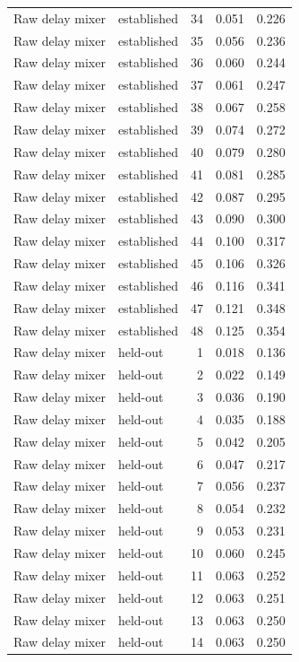 \begin{tabular}{llrrr}
Raw delay mixer & established & 34 & 0.051 & 0.226 \\
Raw delay mixer & established & 35 & 0.056 & 0.236 \\
Raw delay mixer & established & 36 & 0.060 & 0.244 \\
Raw delay mixer & established & 37 & 0.061 & 0.247 \\
Raw delay mixer & established & 38 & 0.067 & 0.258 \\
Raw delay mixer & established & 39 & 0.074 & 0.272 \\
Raw delay mixer & established & 40 & 0.079 & 0.280 \\
Raw delay mixer & established & 41 & 0.081 & 0.285 \\
Raw delay mixer & established & 42 & 0.087 & 0.295 \\
Raw delay mixer & established & 43 & 0.090 & 0.300 \\
Raw delay mixer & established & 44 & 0.100 & 0.317 \\
Raw delay mixer & established & 45 & 0.106 & 0.326 \\
Raw delay mixer & established & 46 & 0.116 & 0.341 \\
Raw delay mixer & established & 47 & 0.121 & 0.348 \\
Raw delay mixer & established & 48 & 0.125 & 0.354 \\
Raw delay mixer & held-out & 1 & 0.018 & 0.136 \\
Raw delay mixer & held-out & 2 & 0.022 & 0.149 \\
Raw delay mixer & held-out & 3 & 0.036 & 0.190 \\
Raw delay mixer & held-out & 4 & 0.035 & 0.188 \\
Raw delay mixer & held-out & 5 & 0.042 & 0.205 \\
Raw delay mixer & held-out & 6 & 0.047 & 0.217 \\
Raw delay mixer & held-out & 7 & 0.056 & 0.237 \\
Raw delay mixer & held-out & 8 & 0.054 & 0.232 \\
Raw delay mixer & held-out & 9 & 0.053 & 0.231 \\
Raw delay mixer & held-out & 10 & 0.060 & 0.245 \\
Raw delay mixer & held-out & 11 & 0.063 & 0.252 \\
Raw delay mixer & held-out & 12 & 0.063 & 0.251 \\
Raw delay mixer & held-out & 13 & 0.063 & 0.250 \\
Raw delay mixer & held-out & 14 & 0.063 & 0.250 \\

\end{tabular}
